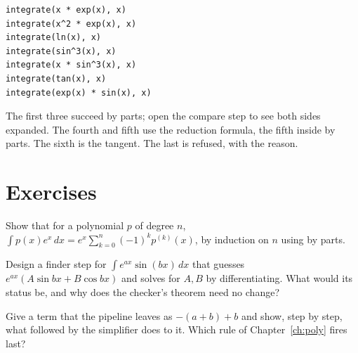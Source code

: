 \begin{trybox}
\begin{verbatim}
integrate(x * exp(x), x)
integrate(x^2 * exp(x), x)
integrate(ln(x), x)
integrate(sin^3(x), x)
integrate(x * sin^3(x), x)
integrate(tan(x), x)
integrate(exp(x) * sin(x), x)
\end{verbatim}
  The first three succeed by parts; open the compare step to see both sides expanded. The
  fourth and fifth use the reduction formula, the fifth inside by parts. The sixth is the
  tangent. The last is refused, with the reason.
\end{trybox}

\section{Exercises}

\begin{exercisebox}
  Show that for a polynomial $p$ of degree $n$, $\int p(x) e^x\,dx = e^x \sum_{k=0}^n (-1)^k
  p^{(k)}(x)$, by induction on $n$ using by parts.
\end{exercisebox}

\begin{exercisebox}
  Design a finder step for $\int e^{ax} \sin(bx)\,dx$ that guesses $e^{ax}(A \sin bx + B\cos bx)$
  and solves for $A, B$ by differentiating. What would its status be, and why does the checker's
  theorem need no change?
\end{exercisebox}

\begin{exercisebox}
  Give a term that the pipeline leaves as $-(a + b) + b$ and show, step by step, what
   followed by the simplifier does to it. Which rule of Chapter~\ref{ch:poly}
  fires last?
\end{exercisebox}
